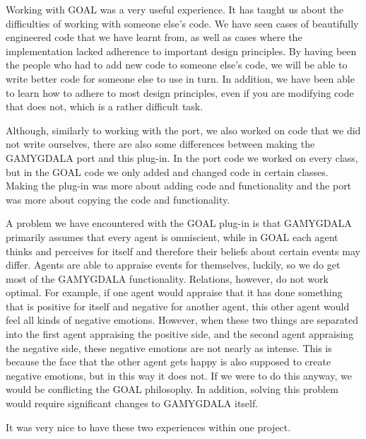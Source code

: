 Working with GOAL was a very useful experience. It has taught us about the difficulties of working with someone else's code. We have seen cases of beautifully engineered code that we have learnt from, as well as cases where the implementation lacked adherence to important design principles. By having been the people who had to add new code to someone else's code, we will be able to write better code for someone else to use in turn. In addition, we have been able to learn how to adhere to most design principles, even if you are modifying code that does not, which is a rather difficult task.

Although, similarly to working with the port, we also worked on code that we did not write ourselves, there are also some differences between making the GAMYGDALA port and this plug-in. In the port code we worked on every class, but in the GOAL code we only added and changed code in certain classes. Making the plug-in was more about adding code and functionality and the port was more about copying the code and functionality.

A problem we have encountered with the GOAL plug-in is that GAMYGDALA primarily assumes that every agent is omniscient, while in GOAL each agent thinks and perceives for itself and therefore their beliefs about certain events may differ. Agents are able to appraise events for themselves, luckily, so we do get most of the GAMYGDALA functionality. Relations, however, do not work optimal. For example, if one agent would appraise that it has done something that is positive for itself and negative for another agent, this other agent would feel all kinds of negative emotions. However, when these two things are separated into the first agent appraising the positive side, and the second agent appraising the negative side, these negative emotions are not nearly as intense. This is because the face that the other agent gets happy is also supposed to create negative emotions, but in this way it does not. If we were to do this anyway, we would be conflicting the GOAL philosophy. In addition, solving this problem would require significant changes to GAMYGDALA itself.

It was very nice to have these two experiences within one project.


